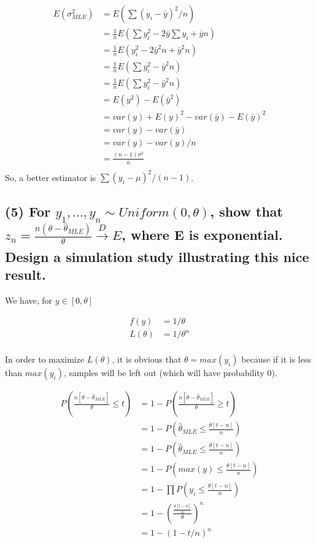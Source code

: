 \documentclass[11pt]{article}
\begin{document}
\begin{align*}
    E(\sigma^2_{MLE}) &= E\left(\sum (y_i - \bar{y})^2 / n\right)\\
    &= \frac{1}{n} E\left(\sum y_i^2 - 2\bar{y} \sum y_i + \bar{y}n \right)\\
    &= \frac{1}{n} E\left( y_i^2 - 2\bar{y}^2n + \bar{y}^2n \right)\\
     &= \frac{1}{n} E\left( \sum y_i^2 - \bar{y}^2n \right)\\
      &= \frac{1}{n} E\left( \sum y_i^2 - \bar{y}^2n \right)\\
       &=  E( y^2) - E(\bar{y}^2)\\
          &=  var(y) + E(y)^2 - var(\bar{y}) - E(\bar{y})^2 \\
            &=  var(y)  - var(\bar{y}) \\
              &=  var(y)  - var(y)/n \\
               &=  \frac{(n-1)\sigma^2}{n}\\
\end{align*}
So, a better estimator is $\sum (y_i - \mu)^2 / (n-1) $.

\subsection*{(5) For $y_1,...,y_n \sim Uniform(0, 
\theta)$, show that $ z_n = \frac{n(\theta-\hat{\theta}_{MLE})}{\theta} \xrightarrow[]{D} E$, where E is exponential. Design a simulation study illustrating this nice result.}

We have, for $y \in [0, \theta]$

\begin{align*}
    f(y) &= 1/\theta \\ 
    L(\theta) &= 1/ \theta ^n\\
\end{align*}

In order to maximize $L(\theta)$, it is obvious that $\theta = max(y_i)$ because if it is less than $ max(y_i)$, samples will be left out (which  will have probability 0).

\begin{align*}
    P\left(\frac{n[\theta-\hat{\theta}_{MLE}] }{\theta} \leq t\right) &= 1 -  P\left(\frac{n[\theta-\hat{\theta}_{MLE}] }{\theta}  \geq t\right)\\
    &= 1 -  P\left(\hat{\theta}_{MLE}  \leq \frac{\theta[t-n]}{n} \right)\\
     &= 1 -  P\left(\hat{\theta}_{MLE}  \leq \frac{\theta[t-n]}{n} \right)\\
      &= 1 -  P\left(max(y)  \leq \frac{\theta[t-n]}{n} \right)\\
       &= 1 -  \prod P\left(y_i  \leq \frac{\theta[t-n]}{n} \right)\\
        &= 1 -  \left( \frac{\frac{\theta[t-n]}{n}}{\theta} \right)^n\\
          &= 1 -  (1-t/n)^n\\
\end{align*}
\end{document}
